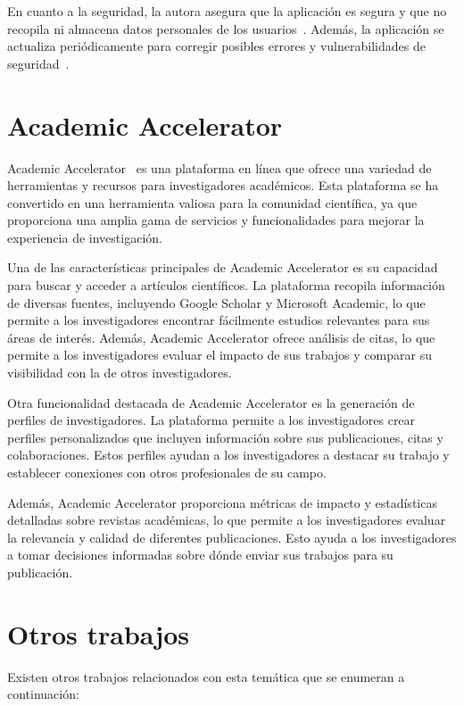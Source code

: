 En cuanto a la seguridad, la autora asegura que la aplicación es segura y que no recopila ni almacena datos personales de los usuarios~\cite{harzing2010}. Además, la aplicación se actualiza periódicamente para corregir posibles errores y vulnerabilidades de seguridad~\cite{pop2007}.


\section{Academic Accelerator}
 Academic Accelerator~\cite{accel2023} es una plataforma en línea que ofrece una variedad de herramientas y recursos para investigadores académicos. Esta plataforma se ha convertido en una herramienta valiosa para la comunidad científica, ya que proporciona una amplia gama de servicios y funcionalidades para mejorar la experiencia de investigación.

Una de las características principales de Academic Accelerator es su capacidad para buscar y acceder a artículos científicos. La plataforma recopila información de diversas fuentes, incluyendo Google Scholar y Microsoft Academic, lo que permite a los investigadores encontrar fácilmente estudios relevantes para sus áreas de interés. Además, Academic Accelerator ofrece análisis de citas, lo que permite a los investigadores evaluar el impacto de sus trabajos y comparar su visibilidad con la de otros investigadores.

Otra funcionalidad destacada de Academic Accelerator es la generación de perfiles de investigadores. La plataforma permite a los investigadores crear perfiles personalizados que incluyen información sobre sus publicaciones, citas y colaboraciones. Estos perfiles ayudan a los investigadores a destacar su trabajo y establecer conexiones con otros profesionales de su campo.

Además, Academic Accelerator proporciona métricas de impacto y estadísticas detalladas sobre revistas académicas, lo que permite a los investigadores evaluar la relevancia y calidad de diferentes publicaciones. Esto ayuda a los investigadores a tomar decisiones informadas sobre dónde enviar sus trabajos para su publicación.


\section{Otros trabajos}

Existen otros trabajos relacionados con esta temática que se enumeran a continuación:

